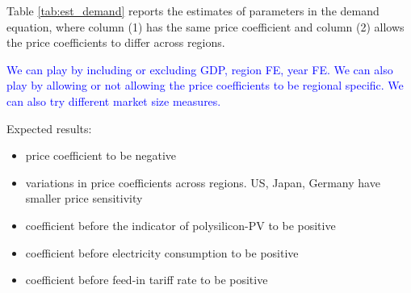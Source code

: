 \documentclass[12pt]{article}
\begin{document}
Table \ref{tab:est_demand} reports the estimates of parameters in the demand equation, where column (1) has the same price coefficient and column (2) allows the price coefficients to differ across regions. 

\textcolor{blue}{We can play by including or excluding GDP, region FE, year FE. We can also play by allowing or not allowing the price coefficients to be regional specific. We can also try different market size measures.}

Expected results:
\begin{itemize}
    \item price coefficient to be negative
    \item variations in price coefficients across regions. US, Japan, Germany have smaller price sensitivity 
    \item coefficient before the indicator of polysilicon-PV to be positive
    \item coefficient before electricity consumption to be positive
    \item coefficient before feed-in tariff rate to be positive
\end{itemize}
\end{document}
